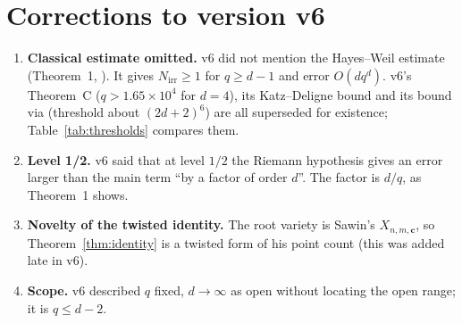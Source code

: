 \documentclass[11pt,a4paper]{article}
\theoremstyle{definition}
\theoremstyle{remark}
\newcommand{\Nirr}{N_{\mathrm{irr}}}
\begin{document}
\section{Corrections to version v6}\label{app:errata6}
\begin{enumerate}[label=F\arabic*.,leftmargin=*]
\item \textbf{Classical estimate omitted.} v6 did not mention the Hayes--Weil estimate
      (Theorem~1, \cite{Cohen2005,Hsu1996,Gao2021}). It gives $\Nirr\ge1$ for $q\ge d-1$ and error
      $O(dq^d)$. v6's Theorem~C ($q>1.65\times10^4$ for $d=4$), its Katz--Deligne bound and its
      bound via \cite{Sawin2021} (threshold about $(2d+2)^6$) are all superseded for existence;
      Table~\ref{tab:thresholds} compares them.
\item \textbf{Level 1/2.} v6 said that at level $1/2$ the Riemann hypothesis gives an error larger
      than the main term ``by a factor of order $d$''. The factor is $d/q$, as Theorem~1 shows.
\item \textbf{Novelty of the twisted identity.} The root variety is Sawin's $X_{n,m,\mathbf c}$, so
      Theorem~\ref{thm:identity} is a twisted form of his point count (this was added late in v6).
\item \textbf{Scope.} v6 described $q$ fixed, $d\to\infty$ as open without locating the open range;
      it is $q\le d-2$.
\end{enumerate}

\begin{table}[ht]
\centering\small

\caption{Thresholds $\log_{10}q_0(d)$ beyond which $\Nirr\ge1$ is proved. ``Classical'' is
Theorem~1 ($q_0=d-2$). The other rigorous columns are the bounds of v6: Katz's Betti bound with
Deligne, Cafure--Matera, and Sawin's theorem. ``v5'' was never proved.}
\label{tab:thresholds}
\end{table}
\end{document}
